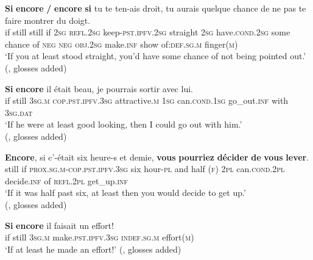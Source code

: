 \begin{exe}
	\ex\label{exAppendixFrenchEncoreIfOnly1}
	\gll \textbf{Si} \textbf{encore} \textbf{/} \textbf{encore} \textbf{si} tu te ten-ais droit, tu aurais quelque chance de ne pas te faire montrer du doigt.\\
	if still {} still if 2\textsc{sg} \textsc{refl}.2\textsc{sg} keep-\textsc{pst}.\textsc{ipfv}.2\textsc{sg} straight 2\textsc{sg} have.\textsc{cond}.2\textsc{sg} some chance of \textsc{neg} \textsc{neg} \textsc{obj}.2\textsc{sg} make.\textsc{inf} show of:\textsc{def}.\textsc{sg}.\textsc{m} finger(\textsc{m})\\
	\glt \lq If you at least stood straight, you'd have some chance of not being pointed out.'  (\cite[83]{VictorriFuchs1996}, glosses added)
	
		\ex\label{exAppendixFrenchEncoreIfOnly2}
	\gll \textbf{Si} \textbf{encore} il était beau, je pourrais sortir avec lui.\\
	if still 3\textsc{sg}.\textsc{m} \textsc{cop}.\textsc{pst}.\textsc{ipfv}.3\textsc{sg} attractive.\textsc{m} 1\textsc{sg} can.\textsc{cond}.1\textsc{sg} go\_out.\textsc{inf} with 3\textsc{sg}.\textsc{dat}\\
	\glt \lq If he were at least good looking, then I could go out with him.'
	\\(\cite{Deloor2012}, glosses added)
	
	\ex\label{exAppendixFrenchEncoreIfOnly3}
	\gll \textbf{Encore}, si c'-était six heure-s et demie, \textbf{vous} \textbf{pourriez} \textbf{décider} \textbf{de} \textbf{vous} \textbf{lever}.\\
	still if \textsc{prox}.\textsc{sg}.\textsc{m}-\textsc{cop}.\textsc{pst}.\textsc{ipfv}.3\textsc{sg} six hour-\textsc{pl} and half (\textsc{f}) 2\textsc{pl}
 can.\textsc{cond}.2\textsc{pl} decide.\textsc{inf} of \textsc{refl}.2\textsc{pl} get\_up.\textsc{inf}\\
	\glt \lq  If it was half past six, at least then you would decide to get up.'
	\\(\cite[83]{VictorriFuchs1996}, glosses added)	
	
	\ex\label{exAppendixFrenchEncoreIfOnly4}
	\gll \textbf{Si} \textbf{encore} il faisait un effort!\\
	if still 3\textsc{sg}.\textsc{m} make.\textsc{pst}.\textsc{ipfv}.3\textsc{sg} \textsc{indef}.\textsc{sg}.\textsc{m} effort(\textsc{m})\\
	\glt \lq If at least he made an effort!\rq{ }(\cite[83]{VictorriFuchs1996}, glosses added)	
	

\end{exe}
